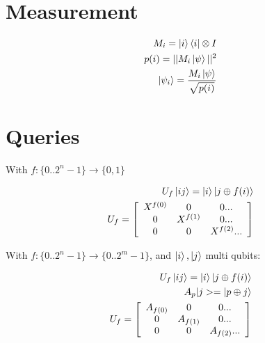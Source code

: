 \documentclass[twocolumn]{article}
\begin{document}
\section{Measurement}

\begin{eqnarray*}
M_i = \ket{i}\bra{i} \otimes I \\
p(i) = || M_i\ket{\psi} ||^2 \\
\ket{\psi_i} = \frac{M_i\ket{\psi}}{\sqrt{p(i)}}
\end{eqnarray*}


\section{Queries}

With $f: \{0 .. 2^n - 1\} \rightarrow \{0,1\}$

\begin{eqnarray*}
U_f\ket{ij} = \ket{i}\ket{j\oplus f(i)} \\
U_f = \left[ \begin{array}{ccc}
  X^{f(0)} & 0 & 0 ... \\
  0 & X^{f(1)} & 0 ... \\
  0 & 0 & X^{f(2)} ... \\
\end{array} \right]
\end{eqnarray*}

With $f: \{0 .. 2^n - 1\} \rightarrow \{0 .. 2^m - 1\}$, and $\ket{i},
\ket{j}$ multi qubits:

\begin{eqnarray*}
U_f\ket{ij} = \ket{i}\ket{j\oplus f(i)} \\
A_p |j> = \ket{p\oplus j} \\
U_f = \left[ \begin{array}{ccc}
  A_{f(0)} & 0 & 0 ... \\
  0 & A_{f(1)} & 0 ... \\
  0 & 0 & A_{f(2)} ... \\
\end{array} \right]
\end{eqnarray*}
\end{document}
